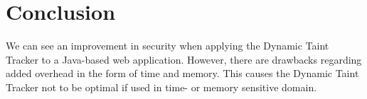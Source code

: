\chapter{Conclusion}
We can see an improvement in security when applying the Dynamic Taint Tracker to a Java-based web application. However, there are drawbacks regarding added overhead in the form of time and memory. This causes the Dynamic Taint Tracker not to be optimal if used in time- or memory sensitive domain.